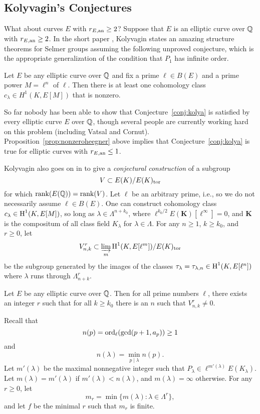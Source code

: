 \subsection{Kolyvagin's Conjectures}
What about curves $E$ with $r_{E,{\rm an}}\geq 2$?  Suppose
that $E$ is an elliptic curve over $\mathbb{Q}$ with
$r_{E,{\rm an}}\geq 2$.  
In the short paper \cite{kolyvagin:structure_of_selmer},
Kolyvagin states an amazing structure 
theorems for Selmer groups assuming the following unproved conjecture,
which is the appropriate generalization of
the condition that $P_1$ has infinite order. 
\begin{conjecture}\label{conj:kolya}
Let $E$ be any elliptic curve over $\mathbb{Q}$ and fix
a prime $\ell\in B(E)$ and a prime power $M=\ell^n$
of $\ell$.
Then there is at least one cohomology class 
$c_{\lambda} \in H^1(K,E[M])$
that is nonzero.
\end{conjecture}
So far nobody has been able to show that Conjecture~\ref{conj:kolya}
is satisfied by every elliptic curve $E$ over $\mathbb{Q}$, though several
people are currently working hard on this problem (including
Vatsal and Cornut).  Proposition~\ref{prop:nonzeroheegner}
above implies that Conjecture~\ref{conj:kolya} is true for
elliptic curves with $r_{E,{\rm an}}\leq 1$.

Kolyvagin also goes on in \cite{kolyvagin:structure_of_selmer}
to give a {\em conjectural construction}
of a subgroup 
$$
 V \subset E(K)/E(K)_{\operatorname{tor}}
$$
for which $\operatorname{rank}(E(\mathbb{Q})) = \operatorname{rank}(V)$.
Let $\ell$ be an arbitrary prime, i.e., so we do not necessarily
assume $\ell\in B(E)$.  
One can construct cohomology class $c_{\lambda} \in \operatorname{H}^1(K, E[M])$,
so long as $\lambda \in \Lambda^{n + k_0}$, where 
$\ell^{k_0/2} E(\mathbf{K})[\ell^\infty] = 0$, and
$\mathbf{K}$ is the compositum of all class field $K_{\lambda}$
for $\lambda \in \Lambda$.  For any $n\geq 1$,
$k\geq k_0$, and $r\geq 0$, let
$$
  V_{n,k}^r \subset \varinjlim_{m}\operatorname{H}^1(K,E[\ell^m])/E(K)_{\operatorname{tor}}
$$
be the subgroup generated by the images of the 
classes $\tau_{\lambda} = \tau_{\lambda,n}\in\operatorname{H}^1(K,E[\ell^n])$ 
where $\lambda$ runs through $\Lambda_{n+k}^r$.

\begin{conjecture}[Kolyvagin]
Let $E$ be any elliptic curve over $\mathbb{Q}$.  Then
for all prime numbers $\ell$, there exists
an integer $r$ such that for all $k\geq k_0$
there is an $n$ such that $V_{n,k}^r\neq 0$.
\end{conjecture}

Recall that
$$n(p) = \operatorname{ord}_\ell(\gcd(p+1, a_p)) \geq 1$$
and
$$
  n(\lambda) = \min_{p\mid \lambda} n(p).
$$
Let $m'(\lambda)$ be the maximal nonnegative
integer such that $P_{\lambda} \in \ell^{m'(\lambda)} E(K_{\lambda})$.
Let $m(\lambda) = m'(\lambda)$ if $m'(\lambda) < n(\lambda)$,
and $m(\lambda) = \infty$ otherwise. 
For any $r\geq 0$, let
$$
  m_r = \min \{ m(\lambda) : \lambda \in \Lambda^r \},
$$
and let $f$ be the minimal $r$ such that $m_r$
is finite.

